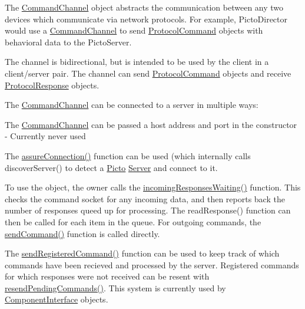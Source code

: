 The \hyperlink{class_picto_1_1_command_channel}{Command\-Channel} object abstracts the communication between any two devices which communicate via network protocols. For example, Picto\-Director would use a \hyperlink{class_picto_1_1_command_channel}{Command\-Channel} to send \hyperlink{struct_picto_1_1_protocol_command}{Protocol\-Command} objects with behavioral data to the Picto\-Server.

The channel is bidirectional, but is intended to be used by the client in a client/server pair. The channel can send \hyperlink{struct_picto_1_1_protocol_command}{Protocol\-Command} objects and receive \hyperlink{struct_picto_1_1_protocol_response}{Protocol\-Response} objects.

The \hyperlink{class_picto_1_1_command_channel}{Command\-Channel} can be connected to a server in multiple ways\-:
\begin{DoxyItemize}
\item The \hyperlink{class_picto_1_1_command_channel}{Command\-Channel} can be passed a host address and port in the constructor -\/ Currently never used
\item The \hyperlink{class_picto_1_1_command_channel_a785fa9b2dccc12b6419dc9d8be3d2e21}{assure\-Connection()} function can be used (which internally calls discover\-Server() to detect a \hyperlink{namespace_picto}{Picto} \hyperlink{class_server}{Server} and connect to it.
\end{DoxyItemize}

To use the object, the owner calls the \hyperlink{class_picto_1_1_command_channel_a2178a704ecbacc3cc4b68af6949326d9}{incoming\-Responses\-Waiting()} function. This checks the command socket for any incoming data, and then reports back the number of responses queed up for processing. The read\-Response() function can then be called for each item in the queue. For outgoing commands, the \hyperlink{class_picto_1_1_command_channel_a5b6805cc3415f144d03ae7e343df3d32}{send\-Command()} function is called directly.

The \hyperlink{class_picto_1_1_command_channel_a1d6415c16c0bea0578876d13fe270074}{send\-Registered\-Command()} function can be used to keep track of which commands have been recieved and processed by the server. Registered commands for which responses were not received can be resent with \hyperlink{class_picto_1_1_command_channel_a3231cb5461098aea05caea3755901d28}{resend\-Pending\-Commands()}. This system is currently used by \hyperlink{class_component_interface}{Component\-Interface} objects.

